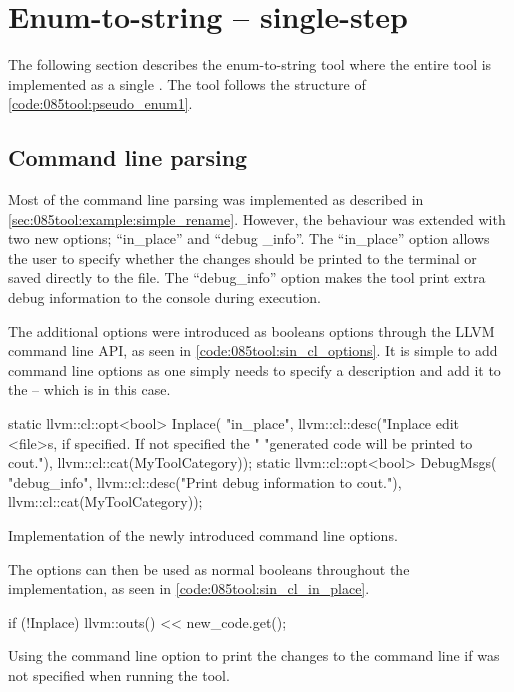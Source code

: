 \section{Enum-to-string -- single-step}
The following section describes the enum-to-string tool where the entire tool is implemented as a single . The tool follows the structure of \cref{code:085tool:pseudo_enum1}.

\subsection{Command line parsing}
Most of the command line parsing was implemented as described in \cref{sec:085tool:example:simple_rename}. However, the behaviour was extended with two new options; ``in\_place'' and ``debug \_info''.
The ``in\_place'' option allows the user to specify whether the changes should be printed to the terminal or saved directly to the file.
The ``debug\_info'' option makes the tool print extra debug information to the console during execution.

The additional options were introduced as booleans options through the LLVM command line API, as seen in \cref{code:085tool:sin_cl_options}. It is simple to add command line options as one simply needs to specify a description and add it to the  -- which is  in this case.

\begin{listing}[H]
    \begin{cppcode}
static llvm::cl::opt<bool> Inplace(
    "in_place",
    llvm::cl::desc("Inplace edit <file>s, if specified. If not specified the "
                   "generated code will be printed to cout."),
    llvm::cl::cat(MyToolCategory));
static llvm::cl::opt<bool> DebugMsgs(
    "debug_info", llvm::cl::desc("Print debug information to cout."),
    llvm::cl::cat(MyToolCategory));
    \end{cppcode}
    \caption{Implementation of the newly introduced command line options.}
    \label{code:085tool:sin_cl_options}
\end{listing}

The options can then be used as normal booleans throughout the implementation, as seen in \cref{code:085tool:sin_cl_in_place}.

\begin{listing}[H]
    \begin{cppcode}
if (!Inplace) {
    llvm::outs() << new_code.get();
}
    \end{cppcode}
    \caption{Using the  command line option to print the changes to the command line if  was not specified when running the tool.}
    \label{code:085tool:sin_cl_in_place}
\end{listing}

